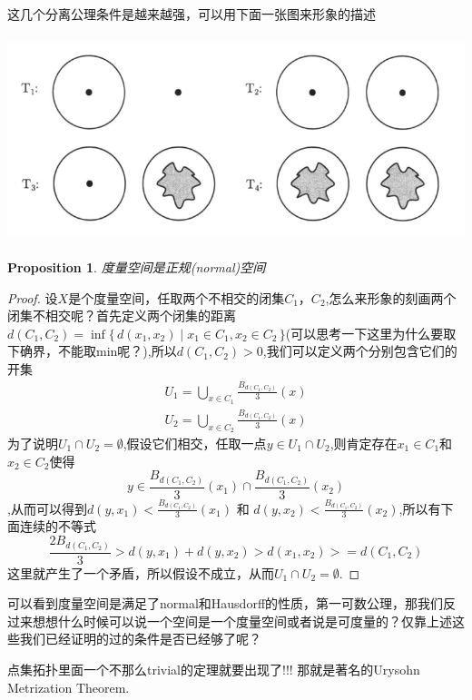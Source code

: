 \documentclass{article}
\newtheorem{proposition}[theorem]{Proposition}
\newcommand\Set[2]{\{\,#1\mid#2\,\}} %
\begin{document}
这几个分离公理条件是越来越强，可以用下面一张图来形象的描述


\begin{center}
\includegraphics[width=14cm, height=6cm]{images/separation-axiom.png}
\end{center}


\begin{proposition}
度量空间是正规(normal)空间
\end{proposition}

\begin{proof}
设$X$是个度量空间，任取两个不相交的闭集$C_1$，$C_2$,怎么来形象的刻画两个闭集不相交呢？首先定义两个闭集的距离$d(C_1,C_2)=\inf\Set{d(x_1,x_2)}{x_1 \in C_1,x_2 \in C_2}$(可以思考一下这里为什么要取下确界，不能取min呢？),所以$d(C_1,C_2)>0$,我们可以定义两个分别包含它们的开集 
\begin{align} 
U_1 = \bigcup\limits_{x \in C_1}\frac{B_{d(C_1,C_2)}}{3}(x) \\ 
U_2 = \bigcup\limits_{x \in C_2}\frac{B_{d(C_1,C_2)}}{3}(x) 
\end{align}
为了说明$U_1 \cap U_2 = \emptyset$,假设它们相交，任取一点$y \in U_1 \cap U_2 $,则肯定存在$x_1 \in C_1$和$x_2 \in C_2$使得\[y \in \frac{B_{d(C_1,C_2)}}{3}(x_1) \cap \frac{B_{d(C_1,C_2)}}{3}(x_2) \],从而可以得到$d(y,x_1) < \frac{B_{d(C_1,C_2)}}{3}(x_1)$ 和 $d(y,x_2) < \frac{B_{d(C_1,C_2)}}{3}(x_2)$,所以有下面连续的不等式\[\frac{2B_{d(C_1,C_2)}}{3} > d(y,x_1) + d(y,x_2) > d(x_1,x_2) >= d(C_1,C_2)\]这里就产生了一个矛盾，所以假设不成立，从而$U_1 \cap U_2 = \emptyset$.
\end{proof}

可以看到度量空间是满足了\rm normal和\rm Hausdorff的性质，第一可数公理，那我们反过来想想什么时候可以说一个空间是一个度量空间或者说是可度量的？仅靠上述这些我们已经证明的过的条件是否已经够了呢？

点集拓扑里面一个不那么trivial的定理就要出现了!!! 那就是著名的Urysohn Metrization Theorem.
\end{document}
